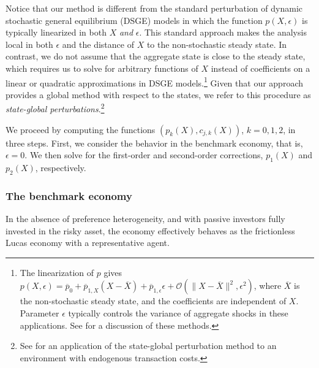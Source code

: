 Notice that our method is different from the standard perturbation of dynamic stochastic general equilibrium (DSGE) models in which the function $p(X,\epsilon)$ is typically linearized in both $X$ \textit{and} $\epsilon$. This standard approach makes the analysis local in both $\epsilon$ and the distance of $X$ to the non-stochastic steady state. In contrast, we do not assume that the aggregate state is close to the steady state, which requires us to solve for arbitrary functions of $X$ instead of coefficients on a linear or quadratic approximations in DSGE models.\footnote{The linearization of $p$ gives $p(X,\epsilon) = \overline{p}_0 + \overline{p}_{1,X} \left(X-\overline{X}\right) + \overline{p}_{1,\epsilon} \epsilon + \mathcal{O}\left(\|X-\overline{X}\|^2, \epsilon^2\right)$, where $\overline{X}$ is the non-stochastic steady state, and the coefficients are independent of $X$. Parameter $\epsilon$ typically controls the variance of aggregate shocks in these applications. See \citet{schmitt2004solving} for a discussion of these methods.} 
Given that our approach provides a global method with respect to the states, we refer to this procedure as \textit{state-global perturbations}.\footnote{See \citet{kargar2020competitive} for an application of the state-global perturbation method to an environment with endogenous transaction costs.}

We proceed by computing the functions $\left (p_{k}(X), c_{j,k}(X)\right )$, $k=0,1,2$, in three steps. First, we consider the behavior in the benchmark economy, that is, $\epsilon = 0$. We then solve for the first-order and second-order corrections, $p_1(X)$ and $p_2(X)$, respectively.


\subsubsection{The benchmark economy}

In the absence of preference heterogeneity, and with passive investors fully invested in the risky asset, the economy effectively behaves as the frictionless Lucas economy with a representative agent. 

